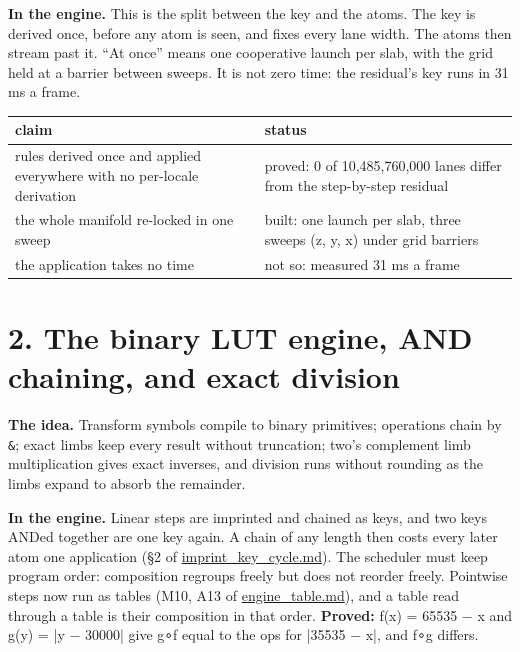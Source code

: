 \textbf{In the engine.} This is the split between the key and the atoms. The key is derived once, before any atom is seen, and fixes every lane width. The atoms then stream past it. “At once” means one cooperative launch per slab, with the grid held at a barrier between sweeps. It is not zero time: the residual's key runs in 31 ms a frame.

{\small
\setlength{\tabcolsep}{6pt}
\begin{longtable}{>{\RaggedRight\arraybackslash}p{}>{\RaggedRight\arraybackslash}p{}}
\toprule
claim & status \\
\midrule
\endhead
rules derived once and applied everywhere with no per-locale derivation & proved: 0 of 10,485,760,000 lanes differ from the step-by-step residual \\
the whole manifold re-locked in one sweep & built: one launch per slab, three sweeps (z, y, x) under grid barriers \\
the application takes no time & not so: measured 31 ms a frame \\
\bottomrule
\end{longtable}
}

\section{\texorpdfstring{2. The binary LUT engine, AND chaining, and exact division}{2. The binary LUT engine, AND chaining, and exact division}}

\textbf{The idea.} Transform symbols compile to binary primitives; operations chain by \texttt{\&}; exact limbs keep every result without truncation; two's complement limb multiplication gives exact inverses, and division runs without rounding as the limbs expand to absorb the remainder.

\textbf{In the engine.} Linear steps are imprinted and chained as keys, and two keys ANDed together are one key again. A chain of any length then costs every later atom one application (§2 of \hyperref[chap:imprint-key-cycle]{imprint\_\allowbreak{}key\_\allowbreak{}cycle.md}). The scheduler must keep program order: composition regroups freely but does not reorder freely. Pointwise steps now run as tables (M10, A13 of \hyperref[chap:engine-table]{engine\_\allowbreak{}table.md}), and a table read through a table is their composition in that order. \textbf{Proved:} f(x) = 65535 − x and g(y) = |y − 30000| give g∘f equal to the ops for |35535 − x|, and f∘g differs.


